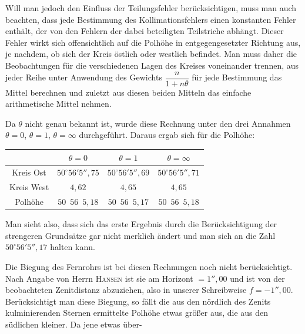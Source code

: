 Will man jedoch den Einfluss der Teilungsfehler berücksichtigen, muss man auch
beachten, dass jede Bestimmung des Kollimationsfehlers einen konstanten Fehler
enthält, der von den Fehlern der dabei beteiligten Teilstriche abhängt. Dieser
Fehler wirkt sich offensichtlich auf die Polhöhe in entgegengesetzter Richtung
aus, je nachdem, ob sich der Kreis östlich oder westlich befindet. Man muss daher
die Beobachtungen für die verschiedenen Lagen des Kreises voneinander trennen,
aus jeder Reihe unter Anwendung des Gewichts \(\dfrac n{1+n\theta}\) für jede
Bestimmung das Mittel berechnen und zuletzt aus diesen beiden Mitteln das
einfache arithmetische Mittel nehmen.

Da \(\theta\) nicht genau bekannt ist, wurde diese Rechnung unter den drei
Annahmen \(\theta=0\), \(\theta=1\), \(\theta=\infty\) durchgeführt. Daraus
ergab sich für die Polhöhe:
\begin{center}
\renewcommand{\arraystretch}{1.18}%
\begin{tabular}{c|c|c|c}
&\(\theta=0\)&\(\theta=1\)&\(\theta=\infty\)\\
\hline
Kreis Ost & \(50^\circ56'5''{,}75\) & \(50^\circ56'5''{,}69\) & \(50^\circ56'5''{,}71\)\\
Kreis West & \hfill \(4{,}62\) & \hfill \(4{,}65\) & \hfill \(4{,}65\)\\
\hline
Polhöhe & \(50\enspace56\enspace5{,}18\) & \(50\enspace56\enspace5{,}17\) & \(50\enspace56\enspace5{,}18\)
\end{tabular}
\end{center}

Man sieht also, dass sich das erste Ergebnis durch die Berücksichtigung der
strengeren Grundsätze gar nicht merklich ändert und man sich an die Zahl
\(50^\circ56'5''{,}17\) halten kann.

Die Biegung des Fernrohrs ist bei diesen Rechnungen noch nicht berücksichtigt.
Nach Angabe von Herrn \textsc{Hansen} ist sie am Horizont \(=1''{,}00\) und
ist von der beobachteten Zenitdistanz abzuziehen, also in unserer Schreibweise
\(f=-1''{,}00\). Berücksichtigt man diese Biegung, so fällt die aus den nördlich
des Zenits kulminierenden Sternen ermittelte Polhöhe etwas größer aus, die aus
den südlichen kleiner. Da jene etwas über-
\par

\par\clearpage
\noindent\makebox[12mm][l]{}\par\medskip

